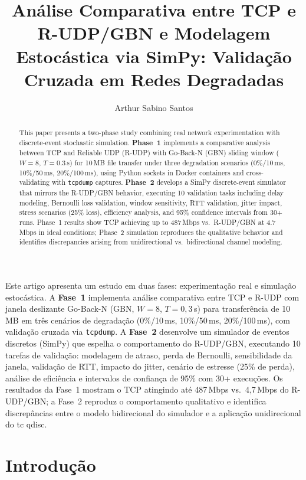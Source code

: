 \documentclass[12pt]{article}
\title{Análise Comparativa entre TCP e R-UDP/GBN e Modelagem\\
       Estocástica via SimPy: Validação Cruzada em Redes Degradadas}
\author{Arthur Sabino Santos\inst{1}}
\begin{document}
\maketitle

\begin{abstract}
This paper presents a two-phase study combining real network experimentation with
discrete-event stochastic simulation. \textbf{Phase~1} implements a comparative
analysis between TCP and Reliable UDP (R-UDP) with Go-Back-N (GBN) sliding window
($W=8$, $T=0.3$\,s) for 10\,MB file transfer under three degradation scenarios
(0\%/10\,ms, 10\%/50\,ms, 20\%/100\,ms), using Python sockets in Docker containers
and cross-validating with \texttt{tcpdump} captures.
\textbf{Phase~2} develops a SimPy discrete-event simulator that mirrors the R-UDP/GBN
behavior, executing 10 validation tasks including delay modeling, Bernoulli loss
validation, window sensitivity, RTT validation, jitter impact, stress scenarios (25\%
loss), efficiency analysis, and 95\% confidence intervals from 30+ runs.
Phase~1 results show TCP achieving up to 487\,Mbps vs.\ R-UDP/GBN at 4.7\,Mbps in
ideal conditions; Phase~2 simulation reproduces the qualitative behavior and identifies
discrepancies arising from unidirectional vs.\ bidirectional channel modeling.
\end{abstract}

\begin{resumo}
Este artigo apresenta um estudo em duas fases: experimentação real e simulação
estocástica. A \textbf{Fase~1} implementa análise comparativa entre TCP e R-UDP com
janela deslizante Go-Back-N (GBN, $W=8$, $T=0{,}3$\,s) para transferência de 10\,MB
em três cenários de degradação (0\%/10\,ms, 10\%/50\,ms, 20\%/100\,ms), com
validação cruzada via \texttt{tcpdump}. A \textbf{Fase~2} desenvolve um simulador
de eventos discretos (SimPy) que espelha o comportamento do R-UDP/GBN, executando
10 tarefas de validação: modelagem de atraso, perda de Bernoulli, sensibilidade da
janela, validação de RTT, impacto do jitter, cenário de estresse (25\% de perda),
análise de eficiência e intervalos de confiança de 95\% com 30+ execuções.
Os resultados da Fase~1 mostram o TCP atingindo até 487\,Mbps vs.\ 4,7\,Mbps do
R-UDP/GBN; a Fase~2 reproduz o comportamento qualitativo e identifica discrepâncias
entre o modelo bidirecional do simulador e a aplicação unidirecional do tc qdisc.
\end{resumo}

\section{Introdução}
\end{document}
